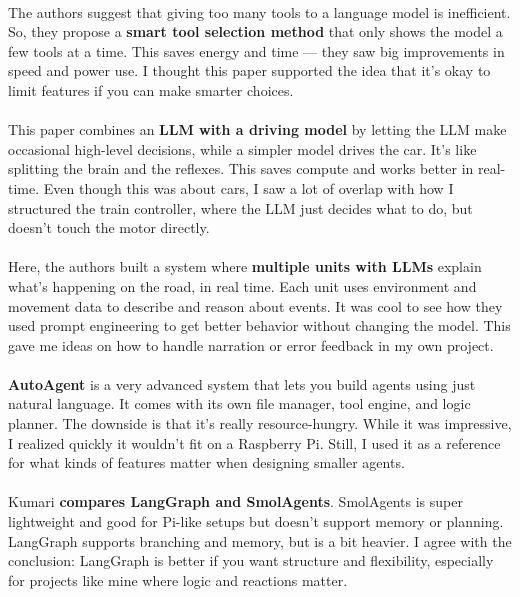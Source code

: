 \paragraph{\cite{paramanayakam_less_2024}}
The authors suggest that giving too many tools to a language model is inefficient. So, they propose a \textbf{smart tool selection method} that only shows the model a few tools at a time. This saves energy and time — they saw big improvements in speed and power use. I thought this paper supported the idea that it's okay to limit features if you can make smarter choices.

\paragraph{\cite{dong_generalizing_2024}}
This paper combines an \textbf{LLM with a driving model} by letting the LLM make occasional high-level decisions, while a simpler model drives the car. It's like splitting the brain and the reflexes. This saves compute and works better in real-time. Even though this was about cars, I saw a lot of overlap with how I structured the train controller, where the LLM just decides what to do, but doesn’t touch the motor directly.

\paragraph{\cite{huang_efficient_2024}}
Here, the authors built a system where \textbf{multiple units with LLMs} explain what’s happening on the road, in real time. Each unit uses environment and movement data to describe and reason about events. It was cool to see how they used prompt engineering to get better behavior without changing the model. This gave me ideas on how to handle narration or error feedback in my own project.

\paragraph{\cite{tang_autoagent_2025}}
\textbf{AutoAgent} is a very advanced system that lets you build agents using just natural language. It comes with its own file manager, tool engine, and logic planner. The downside is that it's really resource-hungry. While it was impressive, I realized quickly it wouldn't fit on a Raspberry Pi. Still, I used it as a reference for what kinds of features matter when designing smaller agents.

\paragraph{\cite{kumari_smolagents_2025}}
Kumari \textbf{compares LangGraph and SmolAgents}. SmolAgents is super lightweight and good for Pi-like setups but doesn’t support memory or planning. LangGraph supports branching and memory, but is a bit heavier. I agree with the conclusion: LangGraph is better if you want structure and flexibility, especially for projects like mine where logic and reactions matter.


